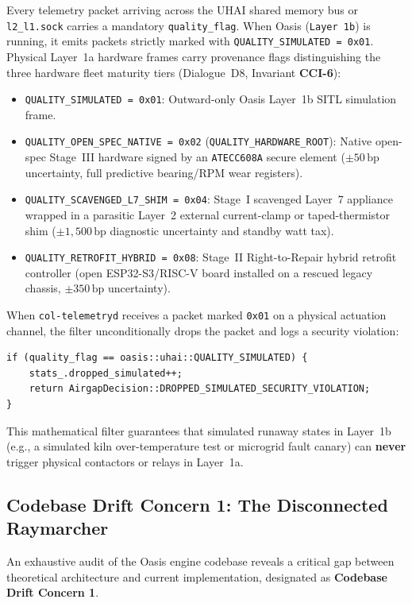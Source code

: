 Every telemetry packet arriving across the UHAI shared memory bus or \texttt{l2\_l1.sock} carries a mandatory \texttt{quality\_flag}. When Oasis (\texttt{Layer 1b}) is running, it emits packets strictly marked with \texttt{QUALITY\_SIMULATED = 0x01}. Physical Layer~1a hardware frames carry provenance flags distinguishing the three hardware fleet maturity tiers (Dialogue~D8, Invariant \textbf{CCI-6}):
\begin{itemize}
    \item \texttt{QUALITY\_SIMULATED = 0x01}: Outward-only Oasis Layer~1b SITL simulation frame.
    \item \texttt{QUALITY\_OPEN\_SPEC\_NATIVE = 0x02} (\texttt{QUALITY\_HARDWARE\_ROOT}): Native open-spec Stage~III hardware signed by an \texttt{ATECC608A} secure element ($\pm 50\,\mathrm{bp}$ uncertainty, full predictive bearing/RPM wear registers).
    \item \texttt{QUALITY\_SCAVENGED\_L7\_SHIM = 0x04}: Stage~I scavenged Layer~7 appliance wrapped in a parasitic Layer~2 external current-clamp or taped-thermistor shim ($\pm 1{,}500\,\mathrm{bp}$ diagnostic uncertainty and standby watt tax).
    \item \texttt{QUALITY\_RETROFIT\_HYBRID = 0x08}: Stage~II Right-to-Repair hybrid retrofit controller (open ESP32-S3/RISC-V board installed on a rescued legacy chassis, $\pm 350\,\mathrm{bp}$ uncertainty).
\end{itemize}

When \texttt{col-telemetryd} receives a packet marked \texttt{0x01} on a physical actuation channel, the filter unconditionally drops the packet and logs a security violation:
\begin{verbatim}
if (quality_flag == oasis::uhai::QUALITY_SIMULATED) {
    stats_.dropped_simulated++;
    return AirgapDecision::DROPPED_SIMULATED_SECURITY_VIOLATION;
}
\end{verbatim}
This mathematical filter guarantees that simulated runaway states in Layer~1b (e.g., a simulated kiln over-temperature test or microgrid fault canary) can \textbf{never} trigger physical contactors or relays in Layer~1a.

\subsection{Codebase Drift Concern 1: The Disconnected Raymarcher}

An exhaustive audit of the Oasis engine codebase reveals a critical gap between theoretical architecture and current implementation, designated as \textbf{Codebase Drift Concern 1}.

